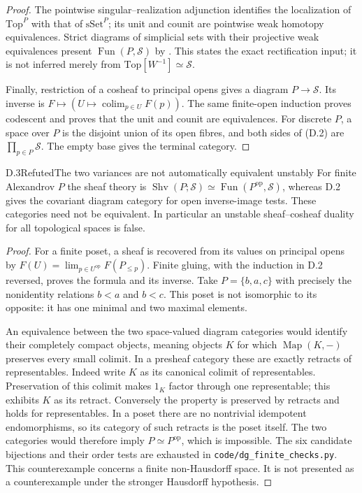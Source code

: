 \begin{proof}
The pointwise singular--realization adjunction identifies the localization
of $\mathrm{Top}^P$ with that of $\mathrm{sSet}^P$; its unit and counit
are pointwise weak homotopy equivalences. Strict diagrams of simplicial
sets with their projective weak equivalences present
$\operatorname{Fun}(P,\mathcal S)$ by
\citet[Proposition 4.2.4.4 and Remark 4.2.4.5]{DGLurieHTT}.
This states the exact rectification input; it is not inferred merely
from $\mathrm{Top}[W^{-1}]\simeq\mathcal S$.

Finally, restriction of a cosheaf to principal opens gives a diagram
$P\to\mathcal S$. Its inverse is
$F\mapsto(U\mapsto\operatorname*{colim}_{p\in U}F(p))$.
The same finite-open induction proves codescent and proves that the
unit and counit are equivalences. For discrete $P$, a space over $P$
is the disjoint union of its open fibres, and both sides of (D.2) are
$\prod_{p\in P}\mathcal S$. The empty base gives the terminal category.
\end{proof}

\begin{claim}{D.3}{Refuted}{The two variances are not automatically equivalent unstably}
For finite Alexandrov $P$ the sheaf theory is
$\operatorname{Shv}(P;\mathcal S)\simeq\operatorname{Fun}(P^{\mathrm{op}},\mathcal S)$,
whereas D.2 gives the covariant diagram category for open inverse-image
tests. These categories need not be equivalent. In particular an
unstable sheaf--cosheaf duality for all topological spaces is false.
\end{claim}
\begin{proof}
For a finite poset, a sheaf is recovered from its values on principal
opens by
$F(U)=\lim_{p\in U^{\mathrm{op}}}F(P_{\leq p})$.
Finite gluing, with the induction in D.2 reversed, proves the formula
and its inverse. Take $P=\{b,a,c\}$ with precisely the nonidentity
relations $b<a$ and $b<c$. This poset is not isomorphic to its opposite:
it has one minimal and two maximal elements.

An equivalence between the two space-valued diagram categories would
identify their completely compact objects, meaning objects $K$ for
which $\operatorname{Map}(K,-)$ preserves every small colimit. In a
presheaf category these are exactly retracts of representables. Indeed
write $K$ as its canonical colimit of representables. Preservation of
this colimit makes $1_K$ factor through one representable; this exhibits
$K$ as its retract. Conversely the property is preserved by retracts
and holds for representables. In a poset there are no nontrivial
idempotent endomorphisms, so its category of such retracts is the poset
itself. The two categories would therefore imply $P\simeq P^{\mathrm{op}}$,
which is impossible. The six candidate bijections and their order tests
are exhausted in \texttt{code/dg\_finite\_checks.py}.
This counterexample concerns a finite non-Hausdorff space. It is not
presented as a counterexample under the stronger Hausdorff hypothesis.
\end{proof}

